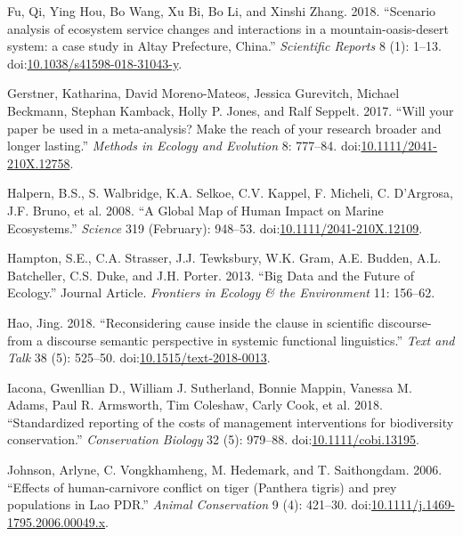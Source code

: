 \documentclass[fleqn,10pt]{wlpeerj} %
\begin{document}
\hypertarget{ref-Fu2018}{}
Fu, Qi, Ying Hou, Bo Wang, Xu Bi, Bo Li, and Xinshi Zhang. 2018.
``Scenario analysis of ecosystem service changes and interactions in a
mountain-oasis-desert system: a case study in Altay Prefecture, China.''
\emph{Scientific Reports} 8 (1): 1--13.
doi:\href{https://doi.org/10.1038/s41598-018-31043-y}{10.1038/s41598-018-31043-y}.

\hypertarget{ref-Gerstner2017}{}
Gerstner, Katharina, David Moreno-Mateos, Jessica Gurevitch, Michael
Beckmann, Stephan Kamback, Holly P. Jones, and Ralf Seppelt. 2017.
``Will your paper be used in a meta-analysis? Make the reach of your
research broader and longer lasting.'' \emph{Methods in Ecology and
Evolution} 8: 777--84.
doi:\href{https://doi.org/10.1111/2041-210X.12758}{10.1111/2041-210X.12758}.

\hypertarget{ref-Halpern2008}{}
Halpern, B.S., S. Walbridge, K.A. Selkoe, C.V. Kappel, F. Micheli, C.
D'Argrosa, J.F. Bruno, et al. 2008. ``A Global Map of Human Impact on
Marine Ecosystems.'' \emph{Science} 319 (February): 948--53.
doi:\href{https://doi.org/10.1111/2041-210X.12109}{10.1111/2041-210X.12109}.

\hypertarget{ref-Hampton2013}{}
Hampton, S.E., C.A. Strasser, J.J. Tewksbury, W.K. Gram, A.E. Budden,
A.L. Batcheller, C.S. Duke, and J.H. Porter. 2013. ``Big Data and the
Future of Ecology.'' Journal Article. \emph{Frontiers in Ecology \& the
Environment} 11: 156--62.

\hypertarget{ref-Hao2018}{}
Hao, Jing. 2018. ``Reconsidering cause inside the clause in scientific
discourse-from a discourse semantic perspective in systemic functional
linguistics.'' \emph{Text and Talk} 38 (5): 525--50.
doi:\href{https://doi.org/10.1515/text-2018-0013}{10.1515/text-2018-0013}.

\hypertarget{ref-Iacona2018}{}
Iacona, Gwenllian D., William J. Sutherland, Bonnie Mappin, Vanessa M.
Adams, Paul R. Armsworth, Tim Coleshaw, Carly Cook, et al. 2018.
``Standardized reporting of the costs of management interventions for
biodiversity conservation.'' \emph{Conservation Biology} 32 (5):
979--88.
doi:\href{https://doi.org/10.1111/cobi.13195}{10.1111/cobi.13195}.

\hypertarget{ref-Johnson2006}{}
Johnson, Arlyne, C. Vongkhamheng, M. Hedemark, and T. Saithongdam. 2006.
``Effects of human-carnivore conflict on tiger (Panthera tigris) and
prey populations in Lao PDR.'' \emph{Animal Conservation} 9 (4):
421--30.
doi:\href{https://doi.org/10.1111/j.1469-1795.2006.00049.x}{10.1111/j.1469-1795.2006.00049.x}.
\end{document}
